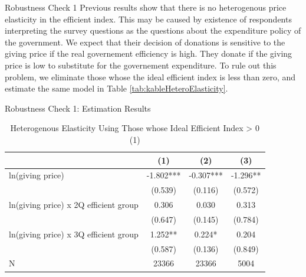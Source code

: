 \documentclass[
  ignorenonframetext,
]{beamer}
\begin{document}
\begin{frame}{Robustness Check 1}
\protect\hypertarget{robustness-check-1}{}
Previous results show that there is no heterogenous price elasticity in the efficient index.
This may be caused by existence of respondents
interpreting the survey questions as the questions about the expenditure policy of the government.
We expect that their decision of donations is sensitive to the giving price
if the real governement efficiency is high.
They donate if the giving price is low to substitute for the governement expenditure.
To rule out this problem, we eliminate those whose the ideal efficient index is less than zero,
and estimate the same model in Table \ref{tab:kableHeteroElasticity}.
\end{frame}

\begin{frame}{Robustness Check 1: Estimation Results}
\protect\hypertarget{robustness-check-1-estimation-results}{}
\begin{table}

\caption{\label{tab:kableSubsetHeteroElasticitySlide1}Heterogenous Elasticity Using Those whose Ideal Efficient Index > 0 (1)}
\centering
\fontsize{8}{10}\selectfont
\begin{tabular}[t]{lccc}
\toprule
 & (1) & (2) & (3)\\
\midrule
ln(giving price) & -1.802*** & -0.307*** & -1.296**\\
 & (0.539) & (0.116) & (0.572)\\
ln(giving price) x 2Q efficient group & 0.306 & 0.030 & 0.313\\
 & (0.647) & (0.145) & (0.784)\\
ln(giving price) x 3Q efficient group & 1.252** & 0.224* & 0.204\\
 & (0.587) & (0.136) & (0.849)\\
N & 23366 & 23366 & 5004\\
\bottomrule
\end{tabular}
\end{table}
\end{frame}
\end{document}
